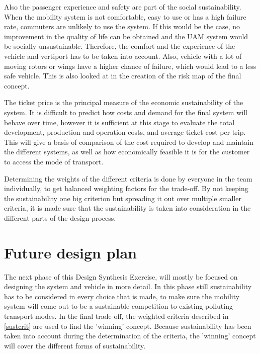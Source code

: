 Also the passenger experience and safety are part of the social sustainability. When the mobility system is not comfortable, easy to use or has a high failure rate, commuters are unlikely to use the system. If this would be the case, no improvement in the quality of life can be obtained and the UAM system would be socially unsustainable. Therefore, the comfort and the experience of the vehicle and vertiport has to be taken into account. Also, vehicle with a lot of moving rotors or wings have a higher chance of failure, which would lead to a less safe vehicle. This is also looked at in the creation of the risk map of the final concept.

The ticket price is the principal measure of the economic sustainability of the system. It is difficult to predict how costs and demand for the final system will behave over time, however it is sufficient at this stage to evaluate the total development, production and operation costs, and average ticket cost per trip. This will give a basis of comparison of the cost required to develop and maintain the different systems, as well as how economically feasible it is for the customer to access the mode of transport. 

Determining the weights of the different criteria is done by everyone in the team individually, to get balanced weighting factors for the trade-off. By not keeping the sustainability one big criterion but spreading it out over multiple smaller criteria, it is made sure that the sustainability is taken into consideration in the different parts of the design process.

\section{Future design plan}
\label{future}
The next phase of this Design Synthesis Exercise, will mostly be focused on designing the system and vehicle in more detail. In this phase still sustainability has to be considered in every choice that is made, to make sure the mobility system will come out to be a sustainable competition to existing polluting transport modes.  In the final trade-off, the weighted criteria described in \autoref{sustcrit} are used to find the 'winning' concept. Because sustainability has been taken into account during the determination of the criteria, the 'winning' concept will cover the different forms of sustainability.


